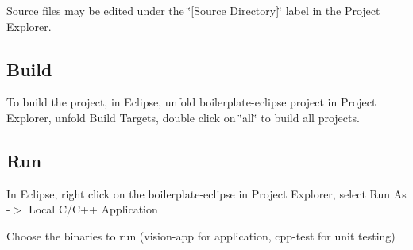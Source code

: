 Source files may be edited under the \char`\"{}\mbox{[}\+Source Directory\mbox{]}\char`\"{} label in the Project Explorer.

\subsection*{Build}

To build the project, in Eclipse, unfold boilerplate-\/eclipse project in Project Explorer, unfold Build Targets, double click on \char`\"{}all\char`\"{} to build all projects.

\subsection*{Run}


\begin{DoxyEnumerate}
\item In Eclipse, right click on the boilerplate-\/eclipse in Project Explorer, select Run As -\/$>$ Local C/\+C++ Application
\item Choose the binaries to run (vision-\/app for application, cpp-\/test for unit testing) 
\end{DoxyEnumerate}